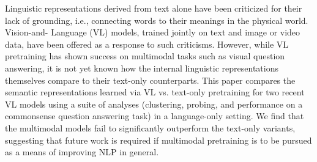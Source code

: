 Linguistic representations derived from text alone have been criticized for their lack of grounding, i.e., connecting words to their meanings in the physical world. Vision-and- Language (VL) models, trained jointly on text and image or video data, have been offered as a response to such criticisms. However, while VL pretraining has shown success on multimodal tasks such as visual question answering, it is not yet known how the internal linguistic representations themselves compare to their text-only counterparts. This paper compares the semantic representations learned via VL vs. text-only pretraining for two recent VL models using a suite of analyses (clustering, probing, and performance on a commonsense question answering task) in a language-only setting. We find that the multimodal models fail to significantly outperform the text-only variants, suggesting that future work is required if multimodal pretraining is to be pursued as a means of improving NLP in general.
